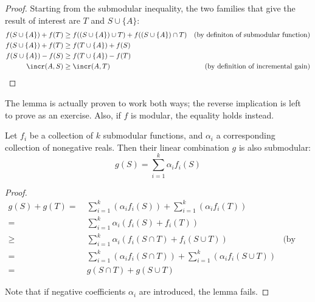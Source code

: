 \begin{proof}
    Starting from the submodular inequality, the two families that give the result of interest are $T$ and $S \cup \{A\}$:
    \begin{align*}
        f(S \cup \{A\}) + f(T)  &\geq f((S \cup \{A\}) \cup T) + f((S \cup \{A\}) \cap T)   & \text{(by definiton of submodular function)} \\
        f(S \cup \{A\}) + f(T)  &\geq f(T \cup \{A\}) + f(S)                                & \\
        f(S \cup \{A\}) - f(S)  &\geq f(T \cup \{A\}) - f(T)                                & \\
        \incr (A, S)            &\geq \incr(A, T)                                           & \text{(by definition of incremental gain)} \\
    \end{align*}
\end{proof}

The lemma is actually proven to work both ways; the reverse implication is left to prove as an exercise. Also, if $f$ is modular, the equality holds instead.

\begin{lemma}\label{lem:submodular-power-function}
    Let $f_i$ be a collection of $k$ submodular functions, and $\alpha_i$ a corresponding collection of nonegative reals. Then their linear combination $g$ is also submodular:
    \[
        g(S) = \sum_{i = 1}^k \alpha_i f_i(S)
    \]
\end{lemma}

\begin{proof}
    \begin{align*}
               g(S) + g(T) 
           =&\ \sum_{i = 1}^k \left( \alpha_i f_i(S) \right) + \sum_{i = 1}^k \left( \alpha_i f_i(T) \right)                & \\
           =&\ \sum_{i = 1}^k \alpha_i \left( f_i(S) + f_i(T) \right)                                                       & \\
        \geq&\ \sum_{i = 1}^k \alpha_i \left( f_i (S \cap T) + f_i (S \cup T) \right)                                       & \text{(by submodularity)} \\
           =&\ \sum_{i = 1}^k \left( \alpha_i f_i(S \cap T)\right) + \sum_{i = 1}^k \left( \alpha_i f_i (S \cup T) \right)  & \\
           =&\ g(S \cap T) + g(S \cup T)                                                                                    &
    \end{align*}
    
    Note that if negative coefficients $\alpha_i$ are introduced, the lemma fails.
\end{proof}


